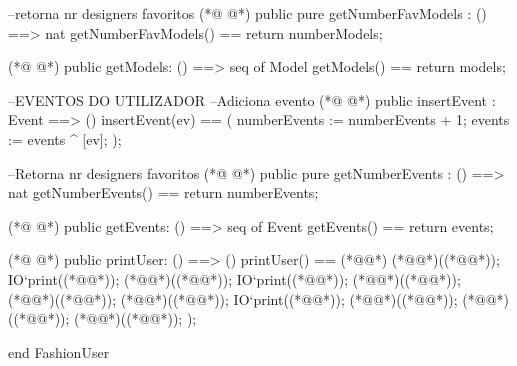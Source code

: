 \begin{vdmpp}[breaklines=true]
  --retorna nr designers favoritos
(*@
\label{getNumberFavModels:79}
@*)
   public pure getNumberFavModels : () ==> nat
   getNumberFavModels() == return numberModels;
   
(*@
\label{getModels:82}
@*)
   public getModels: () ==> seq of Model
   getModels() == return models;
   
   
    --EVENTOS DO UTILIZADOR
    --Adiciona evento
(*@
\label{insertEvent:88}
@*)
  public insertEvent : Event ==> ()
   insertEvent(ev) ==
   (
     numberEvents := numberEvents + 1;
     events := events ^ [ev];
   );
   
  --Retorna nr designers favoritos
(*@
\label{getNumberEvents:96}
@*)
   public pure getNumberEvents : () ==> nat
   getNumberEvents() == return numberEvents;

(*@
\label{getEvents:99}
@*)
   public getEvents: () ==> seq of Event
   getEvents() == return events;
   
(*@
\label{printUser:102}
@*)
   public printUser: () ==> ()
  printUser() == (*@\vdmnotcovered{(}@*)
   (*@@*)((*@@*));
   IO`print((*@@*));
   (*@@*)((*@@*));
   IO`print((*@@*));
   (*@@*)((*@@*));
   (*@@*)((*@@*));
   (*@@*)((*@@*));
   IO`print((*@@*));
   (*@@*)((*@@*));
   (*@@*)((*@@*));
   (*@@*)((*@@*));
  );

end FashionUser
\end{vdmpp}
\bigskip
